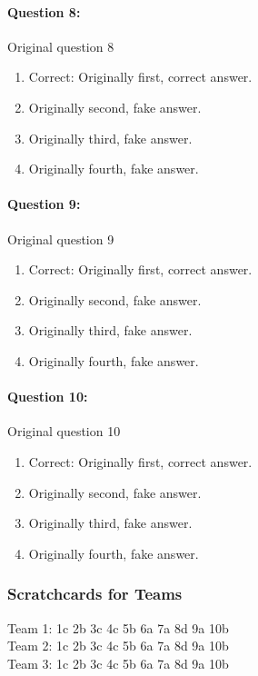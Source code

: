 \documentclass[9pt, twoside, twocolumn]{extarticle}
\begin{document}
\paragraph{Question 8:}
Original question 8

\begin{enumerate}[label=\textbf{{\Alph*}},labelindent=0pt, labelsep=1.5em, parsep=0.2em]
\item Correct: Originally first, correct answer.
\item Originally second, fake answer.
\item Originally third, fake answer.
\item Originally fourth, fake answer.
\end{enumerate}
\paragraph{Question 9:}
Original question 9

\begin{enumerate}[label=\textbf{{\Alph*}},labelindent=0pt, labelsep=1.5em, parsep=0.2em]
\item Correct: Originally first, correct answer.
\item Originally second, fake answer.
\item Originally third, fake answer.
\item Originally fourth, fake answer.
\end{enumerate}
\paragraph{Question 10:}
Original question 10

\begin{enumerate}[label=\textbf{{\Alph*}},labelindent=0pt, labelsep=1.5em, parsep=0.2em]
\item Correct: Originally first, correct answer.
\item Originally second, fake answer.
\item Originally third, fake answer.
\item Originally fourth, fake answer.
\end{enumerate}
\cleardoublepage
\newpage

\subsubsection*{{Scratchcards for Teams}}
Team 1: 1c 2b 3c 4c 5b 6a 7a 8d 9a 10b\\
Team 2: 1c 2b 3c 4c 5b 6a 7a 8d 9a 10b\\
Team 3: 1c 2b 3c 4c 5b 6a 7a 8d 9a 10b\\
\end{document}
